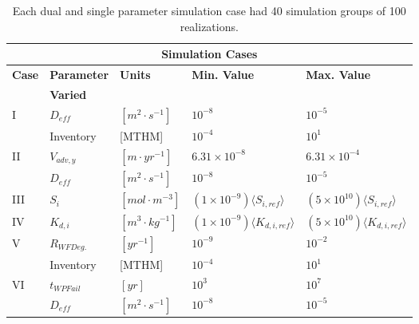 \begin{table*}[htb!]
\centering
\footnotesize{
  \begin{tabularx}{175mm}{|l|X|X|X|X|}
\multicolumn{5}{c}{\textbf{Simulation Cases}}\\
\hline
\textbf{Case} & \textbf{Parameter} & \textbf{Units} & \textbf{Min. Value} & \textbf{Max. Value}\\
              & \textbf{Varied}    &                &                     &                    \\
\hline
I     & $D_{eff}$    & $[m^2\cdot s^{-1}]$       & $10^{-8}$    &  $10^{-5}$ \\
      & Inventory              & [MTHM]         & $10^{-4}$    &  $10^1$ \\
\hline
II    & $V_{adv, y}$ & $[m \cdot yr^{-1}]$       & $6.31\times10^{-8}$  &  $6.31\times10^{-4}$ \\
      & $D_{eff}$    & $[m^2\cdot s^{-1}]$       & $10^{-8}$    &  $10^{-5}$ \\
\hline
III   & $S_i$        & $[mol\cdot m^{-3}]$       & $(1\times10^{-9})\langle S_{i,ref}\rangle $    &  $(5\times10^{10})\langle S_{i,ref}\rangle $ \\
\hline
IV    & $K_{d,i}$    & $[m^3\cdot kg^{-1}]$       & $(1\times10^{-9})\langle 
K_{d,i,ref}\rangle $    &  $(5\times10^{10})\langle K_{d,i,ref}\rangle $ \\
\hline
V     & $R_{WFDeg.}$           & $[yr^{-1}]$       & $10^{-9}$    &  $10^{-2}$ \\
      & Inventory              & [MTHM]         & $10^{-4}$    &  $10^1$ \\
\hline 
VI    & $t_{WPFail}$        & $[yr]$         & $10^3$    &  $10^7$ \\
      & $D_{eff}$           & $[m^2\cdot s^{-1}]$       & $10^{-8}$    &  $10^{-5}$ \\
\hline
\end{tabularx}
\caption{Each dual and single parameter simulation case had 40 simulation 
\label{tab:Cases}
groups of 100 realizations.}
}
\end{table*}
